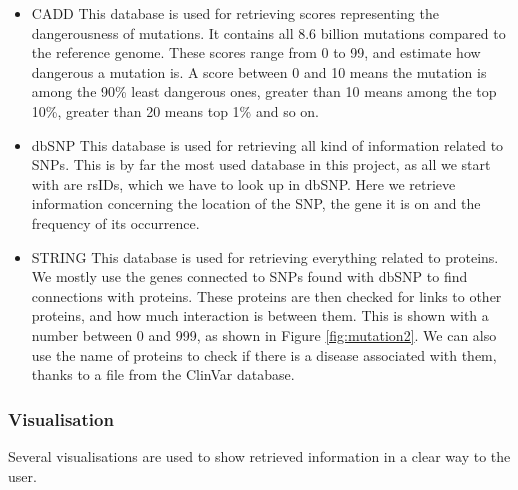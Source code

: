 \begin{itemize}
  \item CADD\cite{kircher2014general}
  	\subitem This database is used for retrieving scores representing the dangerousness of mutations. It contains all 8.6 billion mutations compared to the reference genome. These scores range from 0 to 99, and estimate how dangerous a mutation is. A score between 0 and 10 means the mutation is among the 90\% least dangerous ones, greater than 10 means among the top 10\%, greater than 20 means top 1\% and so on.
  \item dbSNP\cite{sherry2001dbsnp}
  	\subitem This database is used for retrieving all kind of information related to SNPs. This is by far the most used database in this project, as all we start with are rsIDs, which we have to look up in dbSNP. Here we retrieve information concerning the location of the SNP, the gene it is on and the frequency of its occurrence.
  \item STRING\cite{franceschini2013string}
  	\subitem This database is used for retrieving everything related to proteins. We mostly use the genes connected to SNPs found with dbSNP to find connections with proteins. These proteins are then checked for links to other proteins, and how much interaction is between them. This is shown with a number between 0 and 999, as shown in Figure \ref{fig:mutation2}. We can also use the name of proteins to check if there is a disease associated with them, thanks to a file from the ClinVar database\cite{landrum2013clinvar}.
\end{itemize}

\subsubsection{Visualisation}

Several visualisations are used to show retrieved information in a clear way to the user.

